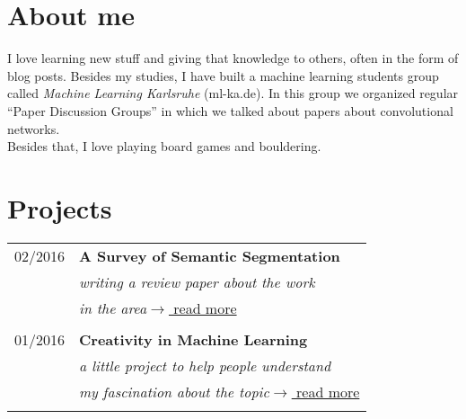 \documentclass[a4paper,10pt]{article} %
\begin{document}
{\begin{minipage}[t]{0.5\textwidth}
\section{About me}
I love learning new stuff and giving that knowledge to others, often in the
form of blog posts. Besides my studies, I have built a machine learning
students group called \textit{Machine Learning Karlsruhe} (ml-ka.de). In this
group we organized regular \enquote{Paper Discussion Groups} in which we talked
about papers about convolutional networks.\\
Besides that, I love playing board games and bouldering.

\end{minipage} %
\hfill
\begin{minipage}[t]{0.44\textwidth}
\vspace{0pt} %


\section{Projects}

\begin{tabular}{rl}
02/2016  & \textbf{A Survey of Semantic Segmentation}\\
& \textit{writing a review paper about the work }\\
& \textit{in the area}\hfill \href{https://arxiv.org/abs/1602.06541}{$\rightarrow$ read more}\\ \\

01/2016  & \textbf{Creativity in Machine Learning}\\
& \textit{a little project to help people understand}\\
& \textit{my fascination about the topic}\hfill \href{https://arxiv.org/abs/1601.03642}{$\rightarrow$ read more}\\ \\


\end{tabular}
\end{minipage}}
\end{document}
